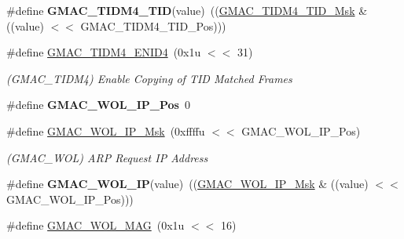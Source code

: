 \begin{DoxyCompactItemize}
\mbox{\label{group__SAME70__GMAC_gab9397d8e34dca72734b019b92067c66b}} 
\#define {\bfseries G\+M\+A\+C\+\_\+\+T\+I\+D\+M4\+\_\+\+T\+ID}(value)~((\mbox{\hyperlink{group__SAMV71__GMAC_ga8ff11c8fe9e79c07cb9169549b3fcd62}{G\+M\+A\+C\+\_\+\+T\+I\+D\+M4\+\_\+\+T\+I\+D\+\_\+\+Msk}} \& ((value) $<$$<$ G\+M\+A\+C\+\_\+\+T\+I\+D\+M4\+\_\+\+T\+I\+D\+\_\+\+Pos)))
\item 
\mbox{\label{group__SAME70__GMAC_gad43fbc1ca24ce6ae11dff7a7351ce19d}} 
\#define \mbox{\hyperlink{group__SAME70__GMAC_gad43fbc1ca24ce6ae11dff7a7351ce19d}{G\+M\+A\+C\+\_\+\+T\+I\+D\+M4\+\_\+\+E\+N\+I\+D4}}~(0x1u $<$$<$ 31)
\begin{DoxyCompactList}\small\item\em (G\+M\+A\+C\+\_\+\+T\+I\+D\+M4) Enable Copying of T\+ID Matched Frames \end{DoxyCompactList}\item 
\mbox{\label{group__SAME70__GMAC_ga29bd5c1e8a78e286d366d25fd422b500}} 
\#define {\bfseries G\+M\+A\+C\+\_\+\+W\+O\+L\+\_\+\+I\+P\+\_\+\+Pos}~0
\item 
\mbox{\label{group__SAME70__GMAC_ga6e4d108513c5f0c545cc95b0cdc93cd4}} 
\#define \mbox{\hyperlink{group__SAME70__GMAC_ga6e4d108513c5f0c545cc95b0cdc93cd4}{G\+M\+A\+C\+\_\+\+W\+O\+L\+\_\+\+I\+P\+\_\+\+Msk}}~(0xffffu $<$$<$ G\+M\+A\+C\+\_\+\+W\+O\+L\+\_\+\+I\+P\+\_\+\+Pos)
\begin{DoxyCompactList}\small\item\em (G\+M\+A\+C\+\_\+\+W\+OL) A\+RP Request IP Address \end{DoxyCompactList}\item 
\mbox{\label{group__SAME70__GMAC_ga370a8f199d31f90b885207b9b1fa29df}} 
\#define {\bfseries G\+M\+A\+C\+\_\+\+W\+O\+L\+\_\+\+IP}(value)~((\mbox{\hyperlink{group__SAMV71__GMAC_ga6e4d108513c5f0c545cc95b0cdc93cd4}{G\+M\+A\+C\+\_\+\+W\+O\+L\+\_\+\+I\+P\+\_\+\+Msk}} \& ((value) $<$$<$ G\+M\+A\+C\+\_\+\+W\+O\+L\+\_\+\+I\+P\+\_\+\+Pos)))
\item 
\mbox{\label{group__SAME70__GMAC_ga8107b810c0592d5a390f110d9ee2cfda}} 
\#define \mbox{\hyperlink{group__SAME70__GMAC_ga8107b810c0592d5a390f110d9ee2cfda}{G\+M\+A\+C\+\_\+\+W\+O\+L\+\_\+\+M\+AG}}~(0x1u $<$$<$ 16)
$$
\end{DoxyCompactItemize}
